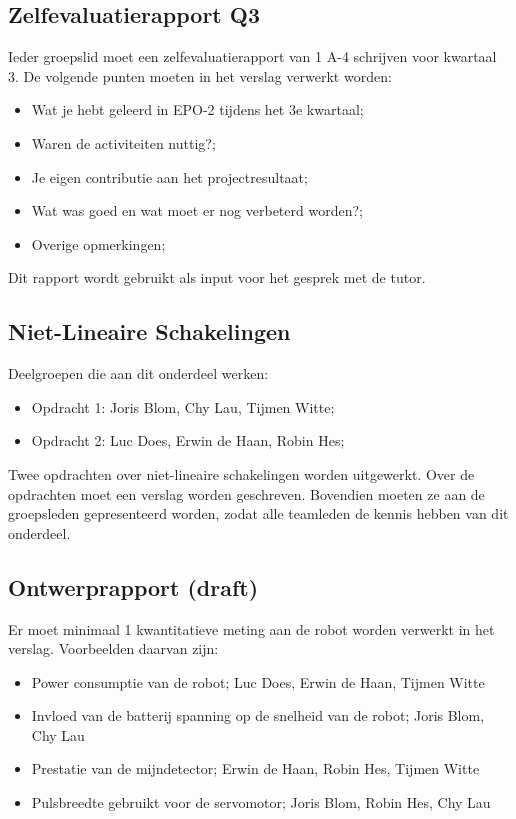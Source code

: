\documentclass[11pt]{article}
\begin{document}
\subsection{Zelfevaluatierapport Q3}
Ieder groepslid moet een zelfevaluatierapport van 1 A-4 schrijven voor kwartaal 3. De volgende punten moeten in het verslag verwerkt worden:
\begin{itemize}
\item Wat je hebt geleerd in EPO-2 tijdens het 3e kwartaal;
\item Waren de activiteiten nuttig?;
\item Je eigen contributie aan het projectresultaat;
\item Wat was goed en wat moet er nog verbeterd worden?;
\item Overige opmerkingen;
\end{itemize}
Dit rapport wordt gebruikt als input voor het gesprek met de tutor. 


\subsection{Niet-Lineaire Schakelingen}
Deelgroepen die aan dit onderdeel werken:
\begin{itemize}
\item Opdracht 1: Joris Blom, Chy Lau, Tijmen Witte;
\item Opdracht 2: Luc Does, Erwin de Haan, Robin Hes;
\end{itemize}
Twee opdrachten over niet-lineaire schakelingen worden uitgewerkt. Over de opdrachten moet een verslag worden geschreven. Bovendien moeten ze aan de groepsleden gepresenteerd worden, zodat alle teamleden de kennis hebben van dit onderdeel.

\subsection{Ontwerprapport (draft)}
Er moet minimaal 1 kwantitatieve meting aan de robot worden verwerkt in het verslag. Voorbeelden daarvan zijn:
\begin{itemize}
\item Power consumptie van de robot; Luc Does, Erwin de Haan, Tijmen Witte
\item Invloed van de batterij spanning op de snelheid van de robot; Joris Blom, Chy Lau
\item Prestatie van de mijndetector; Erwin de Haan, Robin Hes, Tijmen Witte
\item Pulsbreedte gebruikt voor de servomotor; Joris Blom, Robin Hes, Chy Lau 
\end{itemize}
\end{document}
